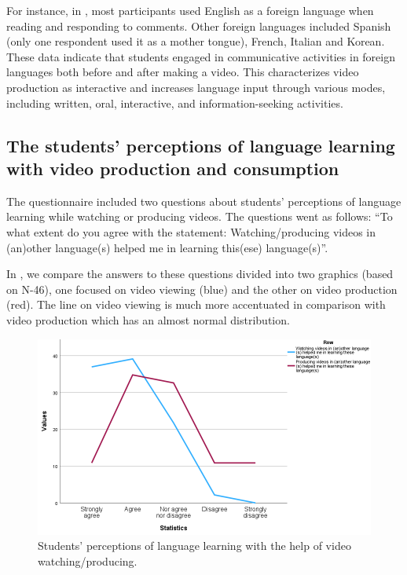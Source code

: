 For instance, in , most participants used English as a foreign
language when reading and responding to comments. Other foreign
languages included Spanish (only one respondent used it as a mother
tongue), French, Italian and Korean. These data indicate that students
engaged in communicative activities in foreign languages both before and
after making a video. This characterizes video production as interactive
and increases language input through various modes, including written,
oral, interactive, and information-seeking activities.

\subsection{The students' perceptions of language learning with video production and consumption}

The questionnaire included two questions about students' perceptions of
language learning while watching or producing videos. The questions went
as follows: ``To what extent do you agree with the statement:
Watching/producing videos in (an)other language(s) helped me in learning
this(ese) language(s)''.

In , we compare the answers to these questions divided into two
graphics (based on N-46), one focused on video viewing (blue) and the
other on video production (red). The line on video viewing is much more
accentuated in comparison with video production which has an almost
normal distribution.

\begin{figure}[htbp]
\centering
\begin{minipage}{\textwidth}
\includegraphics[width=\textwidth]{Fig-3.png}
\caption{Students' perceptions of language learning with the help
	of video watching/producing.}
\label{fig-03}
\end{minipage}
\end{figure}

